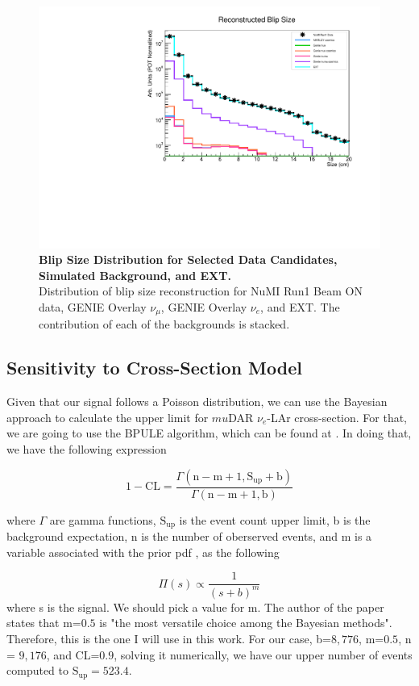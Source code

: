 \begin{figure}[h!]
    \centering
    \includegraphics[width=120mm]{Figures/size.pdf}
    \caption[Blip Size Distribution for Selected Data Candidates, Simulated Background, and EXT.]{{\textbf{Blip Size Distribution for Selected Data Candidates, Simulated Background, and EXT.}}\\ Distribution of blip size reconstruction for NuMI Run1 Beam ON data, GENIE Overlay $\nu_{\mu}$, GENIE Overlay $\nu_{e}$, and EXT. The contribution of each of the backgrounds is stacked.}
    \label{data_mc_size}
\end{figure}

\clearpage
\subsection{Sensitivity to Cross-Section Model}
Given that our signal follows a Poisson distribution, we can use the Bayesian approach to calculate the upper limit for $mu$DAR $\nu_e$-LAr cross-section. For that, we are going to use the BPULE algorithm, which can be found at \cite{BPULE}. 
In doing that, we have the following expression

\begin{equation}
    1-\textrm{CL} =\frac{\Gamma(\textrm{n}-\textrm{m}+1, \textrm{S}_{\textrm{up}}+\textrm{b})}{\Gamma(\textrm{n}-\textrm{m}+1,\textrm{b})}
\end{equation}

where $\Gamma$ are gamma functions, $\textrm{S}_{\textrm{up}}$ is the event count upper limit, b is 
the background expectation, n is the number of oberserved events, and m is a variable associated with the prior pdf , as the following

\begin{equation}
    \Pi(s) \propto \frac{1}{(s + b)^m}
\end{equation}
where s is the signal. We should pick a value for m. The author of the paper states that m=$0.5$ is "the most versatile choice among the Bayesian methods". Therefore, this is the one I will use in this work.  
For our case, b=$8,776$, m=$0.5$, n = $9,176$, and CL=$0.9$, solving it numerically, we have our upper number of events computed to $\textrm{S}_{\textrm{up}}=523.4$.


